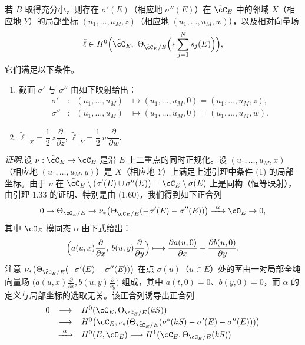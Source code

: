 \begin{lemma}[5.15]
若 $B$ 取得充分小，则存在 $\sigma'(E)$（相应地 $\sigma''(E)$）在 $\tilde{\cC}_E$ 中的邻域 $X$（相应地 $Y$）的局部坐标 $(u_1,\dots,u_M,z)$（相应地 $(u_1,\dots,u_M,w)$），以及相对向量场
\[
\tilde\ell\in H^0\Bigl(\tilde{\cC}_E,\ \Theta_{\tilde{\cC}_E/E}\Bigl(*\sum_{j=1}^N s_j(E)\Bigr)\Bigr),
\]
它们满足以下条件。
\begin{enumerate}[label=(\arabic*),leftmargin=2.6em]
\item 截面 $\sigma'$ 与 $\sigma''$ 由如下映射给出：
\[
\begin{array}{rclll}
\sigma' & : & (u_1,\dots,u_M) & \mapsto (u_1,\dots,u_M,0)=(u_1,\dots,u_M,z),\\[2pt]
\sigma'' & : & (u_1,\dots,u_M) & \mapsto (u_1,\dots,u_M,0)=(u_1,\dots,u_M,w).
\end{array}
\]
\item $\tilde\ell\big|_X=\dfrac12\,z\dfrac{\partial}{\partial z}$,\qquad
      $\tilde\ell\big|_Y=\dfrac12\,w\dfrac{\partial}{\partial w}$.
\end{enumerate}
\end{lemma}


\noindent\textit{证明.}\quad 设 $\nu:\tilde{\cC}_E\to\cC_E$ 是沿 $E$ 上二重点的同时正规化。设 $(u_1,\dots,u_M,x)$（相应地 $(u_1,\dots,u_M,y)$）是 $X$（相应地 $Y$）上满足上述引理中条件 (1) 的局部坐标。由于 $\nu$ 在 $\tilde{\cC}_E\setminus(\sigma'(E)\cup\sigma''(E))=\cC_E\setminus\sigma(E)$ 上是同构（恒等映射），由引理 1.33 的证明、特别是由 (1.60)，我们得到如下正合列
\[
0\to\Theta_{\cC_E/E}\to\nu_*\bigl(\Theta_{\tilde{\cC}_E/E}(-\sigma'(E)-\sigma''(E))\bigr)\xrightarrow{\ \alpha\ }\cO_E\to 0,
\]
其中 $\cO_E$-模同态 $\alpha$ 由下式给出：
\[
\Bigl(a(u,x)\frac{\partial}{\partial x},\,b(u,y)\frac{\partial}{\partial y}\Bigr)
\longmapsto \frac{\partial a(u,0)}{\partial x}+\frac{\partial b(u,0)}{\partial y}.
\]
注意 $\nu_*\bigl(\Theta_{\tilde{\cC}_E/E}(-\sigma'(E)-\sigma''(E))\bigr)$ 在点 $\sigma(u)$（$u\in E$）处的茎由一对局部全纯向量场 $\bigl(a(u,x)\frac{\partial}{\partial x},\allowbreak b(u,y)\frac{\partial}{\partial y}\bigr)$ 组成，其中 $a(t,0)=0$、$b(y,0)=0$，而 $\alpha$ 的定义与局部坐标的选取无关。该正合列诱导出正合列
\[
\begin{array}{rcl}
0 & \longrightarrow & H^0(\cC_E,\Theta_{\cC_E/E}(kS))\\[2pt]
  & \longrightarrow & H^0\bigl(\cC_E,\nu_*(\Theta_{\tilde{\cC}_E/E}(\nu^*(kS)-\sigma'(E)-\sigma''(E)))\bigr)\\[2pt]
  & \xrightarrow{\ \alpha\ } & H^0(E,\cO_E)\longrightarrow H^1(\cC_E,\Theta_{\cC_E/E}(kS))
\end{array}
\]

